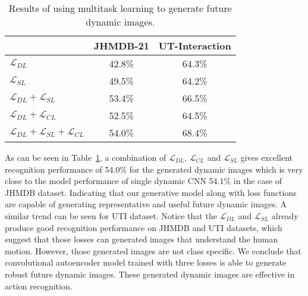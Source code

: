 \begin{table}[t]
    \centering
\begin{tabular}{lc@{\hskip 0.1in}c}
\hline                                                         & \textbf{JHMDB-21} &  \textbf{UT-Interaction}\\ \hline
$\mathcal{L}_{DL}$                                       & 42.8\%              &  64.3\%\\
$\mathcal{L}_{SL}$                                       & 49.5\%              &  64.2\%\\
$\mathcal{L}_{DL} + \mathcal{L}_{SL}$                    & 53.4\%              &  66.5\%\\
$\mathcal{L}_{DL} + \mathcal{L}_{CL}$                    & 52.5\%              &  64.5\%\\
$\mathcal{L}_{DL} + \mathcal{L}_{SL} + \mathcal{L}_{CL}$ & 54.0\%              &  68.4\%\\ \hline
\end{tabular}
  \caption{Results of using multitask learning to generate future dynamic images.}
  \label{tab:digen}
\end{table}

As can be seen in Table~\ref{tab:digen}, a combination of $\mathcal{L}_{DL}$, $\mathcal{L}_{CL}$ and $\mathcal{L}_{SL}$ gives excellent recognition performance of 54.0\% for the generated dynamic images which is very close to the model performance of single dynamic CNN 54.1\% in the case of JHMDB dataset. Indicating that our generative model along with loss functions are capable of generating representative and useful future dynamic images.
A similar trend can be seen for UTI dataset. 
Notice that the $\mathcal{L}_{DL}$ and $\mathcal{L}_{SL}$ already produce good recognition performance on JHMDB and UTI datasets, which suggest that those losses can generated images that understand the human motion. However, those generated images are not class specific.
We conclude that convolutional autoencoder model trained with three losses is able to generate robust future dynamic images. These generated dynamic images are effective in action recognition.

